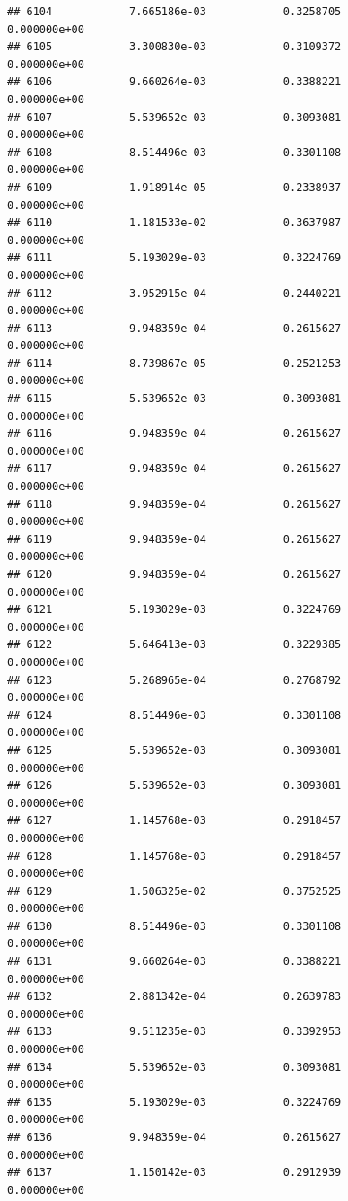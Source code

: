\documentclass[
]{article}
\begin{document}
\begin{verbatim}
## 6104            7.665186e-03            0.3258705            0.000000e+00
## 6105            3.300830e-03            0.3109372            0.000000e+00
## 6106            9.660264e-03            0.3388221            0.000000e+00
## 6107            5.539652e-03            0.3093081            0.000000e+00
## 6108            8.514496e-03            0.3301108            0.000000e+00
## 6109            1.918914e-05            0.2338937            0.000000e+00
## 6110            1.181533e-02            0.3637987            0.000000e+00
## 6111            5.193029e-03            0.3224769            0.000000e+00
## 6112            3.952915e-04            0.2440221            0.000000e+00
## 6113            9.948359e-04            0.2615627            0.000000e+00
## 6114            8.739867e-05            0.2521253            0.000000e+00
## 6115            5.539652e-03            0.3093081            0.000000e+00
## 6116            9.948359e-04            0.2615627            0.000000e+00
## 6117            9.948359e-04            0.2615627            0.000000e+00
## 6118            9.948359e-04            0.2615627            0.000000e+00
## 6119            9.948359e-04            0.2615627            0.000000e+00
## 6120            9.948359e-04            0.2615627            0.000000e+00
## 6121            5.193029e-03            0.3224769            0.000000e+00
## 6122            5.646413e-03            0.3229385            0.000000e+00
## 6123            5.268965e-04            0.2768792            0.000000e+00
## 6124            8.514496e-03            0.3301108            0.000000e+00
## 6125            5.539652e-03            0.3093081            0.000000e+00
## 6126            5.539652e-03            0.3093081            0.000000e+00
## 6127            1.145768e-03            0.2918457            0.000000e+00
## 6128            1.145768e-03            0.2918457            0.000000e+00
## 6129            1.506325e-02            0.3752525            0.000000e+00
## 6130            8.514496e-03            0.3301108            0.000000e+00
## 6131            9.660264e-03            0.3388221            0.000000e+00
## 6132            2.881342e-04            0.2639783            0.000000e+00
## 6133            9.511235e-03            0.3392953            0.000000e+00
## 6134            5.539652e-03            0.3093081            0.000000e+00
## 6135            5.193029e-03            0.3224769            0.000000e+00
## 6136            9.948359e-04            0.2615627            0.000000e+00
## 6137            1.150142e-03            0.2912939            0.000000e+00

\end{verbatim}
\end{document}
